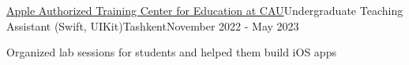 \begin{resume_employer}{\href{https://centralasian.uz/appleauthorisedtrainingcentre}{Apple Authorized Training Center for Education at CAU}}{Undergraduate Teaching Assistant (Swift, UIKit)}{Tashkent}{November 2022 - May 2023}







\item Organized lab sessions for students and helped them build iOS apps
 \end{resume_employer}

